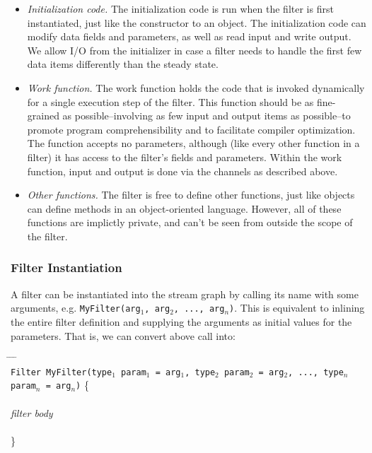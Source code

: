 \documentclass[draft]{article}
\begin{document}
\begin{itemize}
\item {\it Initialization code.}  The initialization code is run when
the filter is first instantiated, just like the constructor to an
object.  The initialization code can modify data fields and
parameters, as well as read input and write output.  We allow I/O from
the initializer in case a filter needs to handle the first few data
items differently than the steady state.

\item {\it Work function.}  The work function holds the code that is
invoked dynamically for a single execution step of the filter.  This
function should be as fine-grained as possible--involving as few input
and output items as possible--to promote program comprehensibility and
to facilitate compiler optimization.  The function accepts no
parameters, although (like every other function in a filter) it has
access to the filter's fields and parameters.  Within the work
function, input and output is done via the channels as described above.

\item {\it Other functions.}  The filter is free to define other
functions, just like objects can define methods in an object-oriented
language.  However, all of these functions are implictly private, and
can't be seen from outside the scope of the filter.

\end{itemize}

\subsubsection{Filter Instantiation}

A filter can be instantiated into the stream graph by calling its name
with some arguments, e.g. {\tt MyFilter(arg$_1$, arg$_2$, ...,
arg$_n$)}.  This is equivalent to inlining the entire filter
definition and supplying the arguments as initial values for the
parameters.  That is, we can convert above call into:

\begin{tabbing}
\hspace{0.2in} \= \hspace{0.2in} \= \hspace{0.2in} \= \hspace{0.2in} \= \\

{\tt Filter MyFilter(type$_1$ param$_1$ = arg$_1$, type$_2$ param$_2$
= arg$_2$, ..., type$_n$ param$_n$ = arg$_n$)} \{ \\ \\

\> {\it filter body} \\ \\
\}
\end{tabbing}
\end{document}

